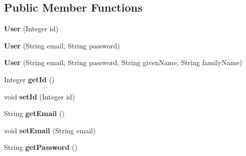 \subsection*{Public Member Functions}
\begin{DoxyCompactItemize}
\item 
\hypertarget{classit_1_1polimi_1_1se_1_1calcare_1_1entities_1_1User_ace8d24a3ab5be15665186d7c8889582e}{}{\bfseries User} (Integer id)\label{classit_1_1polimi_1_1se_1_1calcare_1_1entities_1_1User_ace8d24a3ab5be15665186d7c8889582e}

\item 
\hypertarget{classit_1_1polimi_1_1se_1_1calcare_1_1entities_1_1User_acb37891090b4c06cc25a49046efc3dbe}{}{\bfseries User} (String email, String password)\label{classit_1_1polimi_1_1se_1_1calcare_1_1entities_1_1User_acb37891090b4c06cc25a49046efc3dbe}

\item 
\hypertarget{classit_1_1polimi_1_1se_1_1calcare_1_1entities_1_1User_a1c33c54067a0934f8fc09df29b48a37b}{}{\bfseries User} (String email, String password, String given\+Name, String family\+Name)\label{classit_1_1polimi_1_1se_1_1calcare_1_1entities_1_1User_a1c33c54067a0934f8fc09df29b48a37b}

\item 
\hypertarget{classit_1_1polimi_1_1se_1_1calcare_1_1entities_1_1User_a79b8ea82511aa84c11cceb9edc7b6153}{}Integer {\bfseries get\+Id} ()\label{classit_1_1polimi_1_1se_1_1calcare_1_1entities_1_1User_a79b8ea82511aa84c11cceb9edc7b6153}

\item 
\hypertarget{classit_1_1polimi_1_1se_1_1calcare_1_1entities_1_1User_a45e369dbbe0c91fda1942845cee6b641}{}void {\bfseries set\+Id} (Integer id)\label{classit_1_1polimi_1_1se_1_1calcare_1_1entities_1_1User_a45e369dbbe0c91fda1942845cee6b641}

\item 
\hypertarget{classit_1_1polimi_1_1se_1_1calcare_1_1entities_1_1User_a0876b563f776a37ad18e0e6849edfd62}{}String {\bfseries get\+Email} ()\label{classit_1_1polimi_1_1se_1_1calcare_1_1entities_1_1User_a0876b563f776a37ad18e0e6849edfd62}

\item 
\hypertarget{classit_1_1polimi_1_1se_1_1calcare_1_1entities_1_1User_a2eafc265554e1224fc1d87ac2ddf935e}{}void {\bfseries set\+Email} (String email)\label{classit_1_1polimi_1_1se_1_1calcare_1_1entities_1_1User_a2eafc265554e1224fc1d87ac2ddf935e}

\item 
\hypertarget{classit_1_1polimi_1_1se_1_1calcare_1_1entities_1_1User_af62ba7d1cadd8a5c5b3aa360ea804942}{}String {\bfseries get\+Password} ()\label{classit_1_1polimi_1_1se_1_1calcare_1_1entities_1_1User_af62ba7d1cadd8a5c5b3aa360ea804942}


\end{DoxyCompactItemize}
